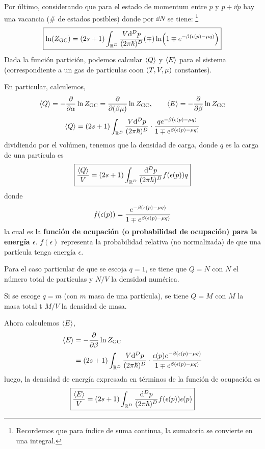 Por último, considerando que para el estado de momentum entre $p$ y $p+\dd p$ hay una vacancia (\# de estados posibles) donde por $\dd N$ se tiene: \footnote{Recordemos que para índice de suma continua, la sumatoria se convierte en una integral.}
\begin{equation}
 \boxed{ \ln(Z_{\rm GC})=(2s+1)\int_{\mathbb{R}^D}\frac{V\dd^Dp}{(2\pi\hbar)^D}(\mp)\ln(1\mp e^{-\beta (\epsilon(p)-\mu q)})}
\end{equation}
Dada la función partición, podemos calcular $\ev{Q}$ y $\ev{E}$ para el sistema (correspondiente a un gas de partículas coon $(T,V,\mu )$ constantes).

En particular, calculemos,
\begin{equation}
  \ev{Q}=-\pdv{\a }\ln\zgc=\pdv{(\b\m )}\ln\zgc,\qquad \ev{E}=-\pdv{\b}\ln\zgc
\end{equation}
\begin{equation}
  \ev{Q}=(2s+1)\int_{\mathbb{R}^D}\frac{V\dd^Dp}{(2\p\hbar)^D}\cdot \frac{qe^{-\b (\epsilon(p)-\m q)}}{1\mp e^{\b (\epsilon(p)-\m q)}}
\end{equation}
dividiendo por el volúmen, tenemos que la densidad de carga, donde $q$ es la carga de una partícula es
\begin{equation}
 \boxed{ \frac{\ev{Q}}{V}=(2s+1)\int_{\mathbb{R}^D}\frac{\dd^Dp}{(2\p\hbar)^D}f(\epsilon(p))q}
\end{equation}
donde
\begin{equation}
  f(\epsilon(p))=\frac{e^{-\beta (\epsilon(p)-\mu q)}}{1\mp e^{\beta (\epsilon(p)-\mu q)}}
\end{equation}
la cual es la \textbf{función de ocupación (o probabilidad de ocupación) para la energía $\epsilon$}. $f(\epsilon)$ representa la probabilidad relativa (no normalizada) de que una partícula tenga energía $\epsilon$.

Para el caso particular de que se escoja $q=1$, se tiene que $Q=N$ con $N$ el número total de partículas y $N/V$ la densidad numérica.

Si se escoge $q=m$ (con $m$ masa de una partícula), se tiene $Q=M$ con $M$ la masa total t $M/V$ la densidad de masa.

Ahora calculemos $\ev{E}$,
\begin{align}
  \ev{E}&=-\pdv{\b}\ln\zgc\\
  &=(2s+1)\int_{\mathbb{R}^D}\frac{V\dd^Dp}{(2\p\hbar)^D}\cdot \frac{\epsilon(p)e^{-\b (\epsilon(p)-\m q)}}{1\mp e^{\b (\epsilon(p)-\m q)}}
\end{align}
luego, la densidad de energía expresada en términos de la función de ocupación es
\begin{equation}
  \boxed{\frac{\ev{E}}{V}=(2s+1)\int_{\mathbb{R}^D}\frac{\dd^Dp}{(2\p\hbar)^D}f(\epsilon(p))\epsilon(p)}
\end{equation}

